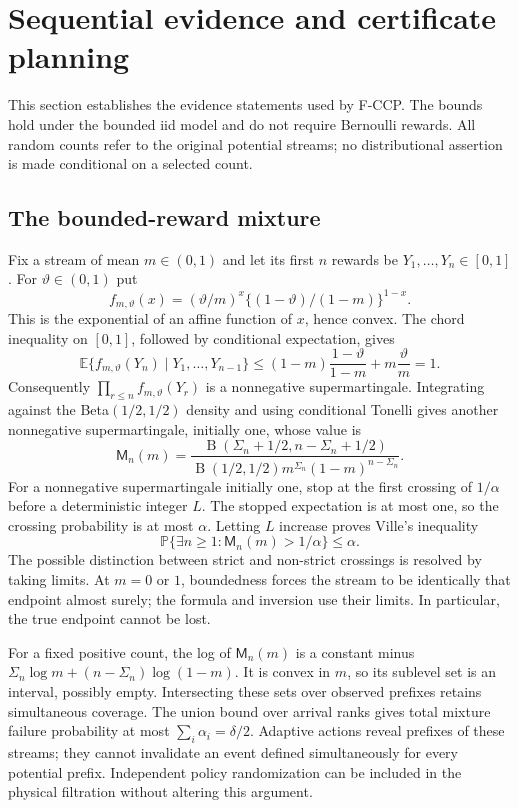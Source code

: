\documentclass[11pt]{article}
\theoremstyle{remark}
\newcommand{\E}{\mathbb E}
\newcommand{\Prob}{\mathbb P}
\begin{document}
\section{Sequential evidence and certificate planning}\label{app:fccp-evidence}
This section establishes the evidence statements used by F-CCP. The
bounds hold under the bounded iid model and do not require Bernoulli
rewards. All random counts refer to the original potential streams;
no distributional assertion is made conditional on a selected count.

\subsection{The bounded-reward mixture}
Fix a stream of mean $m\in(0,1)$ and let its first $n$ rewards be
$Y_1,\ldots,Y_n\in[0,1]$. For $\vartheta\in(0,1)$ put
\[
 f_{m,\vartheta}(x)=
 (\vartheta/m)^x\{(1-\vartheta)/(1-m)\}^{1-x}.
\]
This is the exponential of an affine function of $x$, hence convex.
The chord inequality on $[0,1]$, followed by conditional expectation,
gives
\[
 \E\{f_{m,\vartheta}(Y_n)\mid Y_1,\ldots,Y_{n-1}\}
 \le(1-m)\frac{1-\vartheta}{1-m}
       +m\frac{\vartheta}{m}=1.
\]
Consequently $\prod_{r\le n}f_{m,\vartheta}(Y_r)$ is a nonnegative
supermartingale. Integrating against the Beta$(1/2,1/2)$ density and
using conditional Tonelli gives another nonnegative supermartingale,
initially one, whose value is
\[
 \mathsf M_n(m)=
 \frac{\operatorname B(\Sigma_n+1/2,n-\Sigma_n+1/2)}
 {\operatorname B(1/2,1/2)m^{\Sigma_n}(1-m)^{n-\Sigma_n}}.
\]
For a nonnegative supermartingale initially one, stop at the first
crossing of $1/\alpha$ before a deterministic integer $L$. The stopped
expectation is at most one, so the crossing probability is at most
$\alpha$. Letting $L$ increase proves Ville's inequality
\[
 \Prob\{\exists n\ge1:\mathsf M_n(m)>1/\alpha\}\le\alpha.
\]
The possible distinction between strict and non-strict crossings is
resolved by taking limits. At $m=0$ or $1$, boundedness forces the stream
to be identically that endpoint almost surely; the formula and inversion
use their limits. In particular, the true endpoint cannot be lost.

For a fixed positive count, the log of $\mathsf M_n(m)$ is a constant
minus $\Sigma_n\log m+(n-\Sigma_n)\log(1-m)$. It is convex in $m$,
so its sublevel set is an interval, possibly empty. Intersecting these
sets over observed prefixes retains simultaneous coverage. The union
bound over arrival ranks gives total mixture failure probability at
most $\sum_i\alpha_i=\delta/2$. Adaptive actions reveal prefixes of
these streams; they cannot invalidate an event defined simultaneously
for every potential prefix. Independent policy randomization can be
included in the physical filtration without altering this argument.
\end{document}
